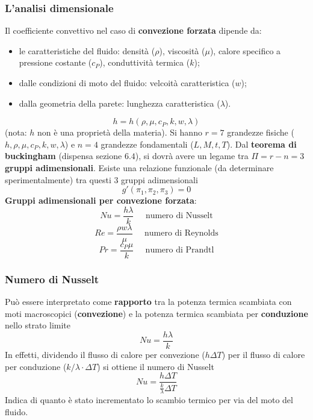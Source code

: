 \subsubsection{L'analisi dimensionale}
Il coefficiente convettivo nel caso di \textbf{convezione forzata} dipende da:
\begin{itemize}
    \item le caratteristiche del fluido: densità ($\rho$), viscosità ($\mu$), calore specifico a pressione costante ($c_P$), conduttività termica ($k$);
    \item dalle condizioni di moto del fluido: velcoità caratteristica ($w$);
    \item dalla geometria della parete: lunghezza caratteristica ($\lambda$).
\end{itemize}
\[
    h = h(\rho, \mu, c_P, k , w , \lambda)
\]
(nota: $h$ non è una proprietà della materia).\newline
\newline
Si hanno $r= 7$ grandezze fisiche ($h, \rho, \mu, c_P, k , w , \lambda$) e $n = 4$ grandezze fondamentali ($L,M,t,T$). \newline
\newline
Dal \textbf{teorema di buckingham} (dispensa sezione $6.4$), si dovrà avere un legame tra $\Pi = r - n = 3$ \textbf{gruppi adimensionali}.\newline
\newline
Esiste una relazione funzionale (da determinare sperimentalmente) tra questi $3$ gruppi adimensionali
\[
    g'(\pi_1, \pi_2, \pi_3) = 0
\]
\textbf{Gruppi adimensionali per convezione forzata}:
\[
    Nu = \frac{h\lambda}{k} \;\;\;\;\; \text{numero di Nusselt}
\]
\[
    Re = \frac{\rho w \lambda}{\mu} \;\;\;\;\;\text{numero di Reynolds}
\]
\[
    Pr = \frac{c_P \mu}{k} \;\;\;\;\;\text{numero di Prandtl}
\]
\subsubsection{Numero di Nusselt}
Può essere interpretato come \textbf{rapporto} tra la potenza termica
scambiata con moti macroscopici (\textbf{convezione}) e la potenza
termica scambiata per \textbf{conduzione} nello strato limite
\[
    Nu = \frac{h\lambda}{k}
\]
In effetti, dividendo il flusso di calore per convezione ($h \Delta T$)
per il flusso di calore per conduzione ($k / \lambda \cdot \Delta T$) si ottiene
il numero di Nusselt
\[
    Nu = \frac{h\Delta T}{\frac{k}{\lambda}\Delta T}
\]
Indica di quanto è stato incrementato lo scambio termico
per via del moto del fluido.
